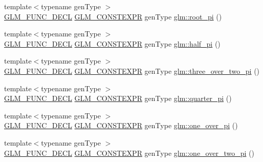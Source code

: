 \begin{DoxyCompactItemize}
\item 
{\footnotesize template$<$typename gen\+Type $>$ }\\\mbox{\hyperlink{setup_8hpp_ab2d052de21a70539923e9bcbf6e83a51}{G\+L\+M\+\_\+\+F\+U\+N\+C\+\_\+\+D\+E\+CL}} \mbox{\hyperlink{setup_8hpp_a08b807947b47031d3a511f03f89645ad}{G\+L\+M\+\_\+\+C\+O\+N\+S\+T\+E\+X\+PR}} gen\+Type \mbox{\hyperlink{group__gtc__constants_ga261380796b2cd496f68d2cf1d08b8eb9}{glm\+::root\+\_\+pi}} ()
\item 
{\footnotesize template$<$typename gen\+Type $>$ }\\\mbox{\hyperlink{setup_8hpp_ab2d052de21a70539923e9bcbf6e83a51}{G\+L\+M\+\_\+\+F\+U\+N\+C\+\_\+\+D\+E\+CL}} \mbox{\hyperlink{setup_8hpp_a08b807947b47031d3a511f03f89645ad}{G\+L\+M\+\_\+\+C\+O\+N\+S\+T\+E\+X\+PR}} gen\+Type \mbox{\hyperlink{group__gtc__constants_ga0c36b41d462e45641faf7d7938948bac}{glm\+::half\+\_\+pi}} ()
\item 
{\footnotesize template$<$typename gen\+Type $>$ }\\\mbox{\hyperlink{setup_8hpp_ab2d052de21a70539923e9bcbf6e83a51}{G\+L\+M\+\_\+\+F\+U\+N\+C\+\_\+\+D\+E\+CL}} \mbox{\hyperlink{setup_8hpp_a08b807947b47031d3a511f03f89645ad}{G\+L\+M\+\_\+\+C\+O\+N\+S\+T\+E\+X\+PR}} gen\+Type \mbox{\hyperlink{group__gtc__constants_gae94950df74b0ce382b1fc1d978ef7394}{glm\+::three\+\_\+over\+\_\+two\+\_\+pi}} ()
\item 
{\footnotesize template$<$typename gen\+Type $>$ }\\\mbox{\hyperlink{setup_8hpp_ab2d052de21a70539923e9bcbf6e83a51}{G\+L\+M\+\_\+\+F\+U\+N\+C\+\_\+\+D\+E\+CL}} \mbox{\hyperlink{setup_8hpp_a08b807947b47031d3a511f03f89645ad}{G\+L\+M\+\_\+\+C\+O\+N\+S\+T\+E\+X\+PR}} gen\+Type \mbox{\hyperlink{group__gtc__constants_ga3c9df42bd73c519a995c43f0f99e77e0}{glm\+::quarter\+\_\+pi}} ()
\item 
{\footnotesize template$<$typename gen\+Type $>$ }\\\mbox{\hyperlink{setup_8hpp_ab2d052de21a70539923e9bcbf6e83a51}{G\+L\+M\+\_\+\+F\+U\+N\+C\+\_\+\+D\+E\+CL}} \mbox{\hyperlink{setup_8hpp_a08b807947b47031d3a511f03f89645ad}{G\+L\+M\+\_\+\+C\+O\+N\+S\+T\+E\+X\+PR}} gen\+Type \mbox{\hyperlink{group__gtc__constants_ga555150da2b06d23c8738981d5013e0eb}{glm\+::one\+\_\+over\+\_\+pi}} ()
\item 
{\footnotesize template$<$typename gen\+Type $>$ }\\\mbox{\hyperlink{setup_8hpp_ab2d052de21a70539923e9bcbf6e83a51}{G\+L\+M\+\_\+\+F\+U\+N\+C\+\_\+\+D\+E\+CL}} \mbox{\hyperlink{setup_8hpp_a08b807947b47031d3a511f03f89645ad}{G\+L\+M\+\_\+\+C\+O\+N\+S\+T\+E\+X\+PR}} gen\+Type \mbox{\hyperlink{group__gtc__constants_ga7c922b427986cbb2e4c6ac69874eefbc}{glm\+::one\+\_\+over\+\_\+two\+\_\+pi}} ()

\end{DoxyCompactItemize}
